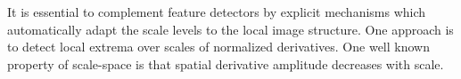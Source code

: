 \cite{Lindberg1998}

It is essential to complement feature detectors by explicit mechanisms which automatically adapt the scale levels to the local image structure. One approach is to detect local extrema over scales of normalized derivatives. One well known property of scale-space is that spatial derivative amplitude decreases with scale.